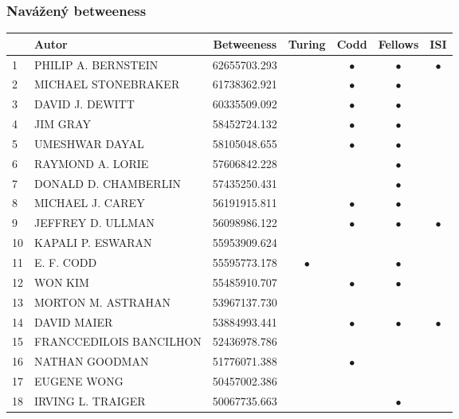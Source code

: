 \documentclass[12pt,titlepage]{report}
\begin{document}
\subsubsection{Navážený betweeness}
\begin{center}
\begin{tabular}{|l|l|c|c|c|c|c|}
\hline
& {\bf Autor} & {\bf Betweeness} & {\bf Turing} & {\bf Codd} & {\bf Fellows} & {\bf ISI} \\
\hline
1 & PHILIP A. BERNSTEIN & 62655703.293 & & $\bullet$ & $\bullet$ & $\bullet$ \\
\hline
2 & MICHAEL STONEBRAKER & 61738362.921 & & $\bullet$ & $\bullet$ &           \\
\hline
3 & DAVID J. DEWITT & 60335509.092     & & $\bullet$ & $\bullet$ &           \\
\hline
4 & JIM GRAY & 58452724.132            & & $\bullet$ & $\bullet$ &           \\
\hline
5 & UMESHWAR DAYAL & 58105048.655      & & $\bullet$ & $\bullet$ &         \\
\hline
6 & RAYMOND A. LORIE & 57606842.228    & &           & $\bullet$ &           \\
\hline
7 & DONALD D. CHAMBERLIN & 57435250.431& &           & $\bullet$ &           \\
\hline
8 & MICHAEL J. CAREY & 56191915.811    & & $\bullet$ & $\bullet$ &         \\
\hline
9 & JEFFREY D. ULLMAN & 56098986.122   & & $\bullet$ & $\bullet$ & $\bullet$ \\
\hline
10 & KAPALI P. ESWARAN & 55953909.624  & &           &           &           \\
\hline
11 & E. F. CODD & 55595773.178         & $\bullet$ & & $\bullet$ &           \\
\hline
12 & WON KIM & 55485910.707            & & $\bullet$ & $\bullet$ &           \\
\hline
13 & MORTON M. ASTRAHAN & 53967137.730 &         &         &         & \\
\hline
14 & DAVID MAIER & 53884993.441        & &$\bullet$&$\bullet$&$\bullet$\\
\hline
15 & FRANCCEDILOIS BANCILHON & 52436978.786 &  &  & &         \\
\hline
16 & NATHAN GOODMAN & 51776071.388& & $\bullet$ &         &         \\
\hline
17 & EUGENE WONG & 50457002.386&         &         &         & \\
\hline
18 & IRVING L. TRAIGER & 50067735.663&         &         &$\bullet$& \\

\end{tabular}
\end{center}
\end{document}
